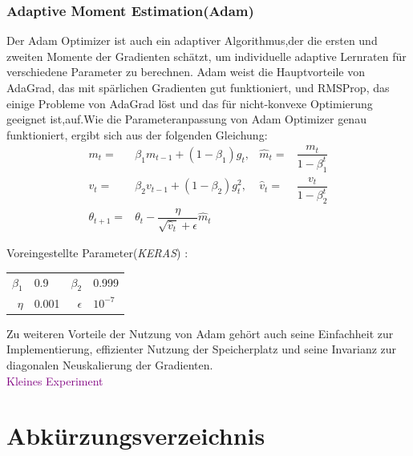 \documentclass[12pt,a4paper]{scrartcl}
\numberwithin{equation}{section}
\begin{document}
\subsubsection{Adaptive Moment Estimation(Adam)}
Der Adam\cite{adam} Optimizer ist auch ein adaptiver Algorithmus,der die ersten und zweiten Momente der Gradienten schätzt, um individuelle adaptive Lernraten für verschiedene Parameter zu berechnen.
Adam weist die Hauptvorteile von AdaGrad, das mit spärlichen Gradienten gut funktioniert, und RMSProp, das einige Probleme von AdaGrad löst und das für nicht-konvexe Optimierung geeignet ist,auf.Wie die Parameteranpassung von Adam Optimizer genau funktioniert, ergibt sich aus der folgenden Gleichung: 
\begin{equation}\label{ADAM}
\begin{aligned}
m_{t}=& \beta_{1}m_{t-1}+(1-\beta_{1})g_{t}, &  \widehat{m}_{t} =& \dfrac{m_{t}}{1-\beta_{1}^t}\\
v_{t}=& \beta_{2}v_{t-1}+(1-\beta_{2})g^2_t,&\widehat{v}_{t} =&\dfrac{v_t}{1-\beta_{2}^t}\\
\theta_{t+1} =& \theta_{t} -\dfrac{\eta}{\sqrt{\widehat{v}_{t}}+\epsilon}\widehat{m}_{t}
\end{aligned}
\end{equation}
\begin{center}
	Voreingestellte Parameter(\textit{KERAS}) :
	\begin{tabular}{r@{: }l r@{: }l}
		$ \beta_{1}$ & 0.9 &$ \beta_{2} $& 0.999\\
		$ \eta$& 0.001& $ \epsilon $ & $ 10^{-7} $
	\end{tabular}
\end{center}

Zu weiteren Vorteile der Nutzung von Adam gehört auch seine Einfachheit zur Implementierung, effizienter Nutzung der Speicherplatz und seine Invarianz zur diagonalen Neuskalierung der Gradienten.
\\ \textcolor{purple}{Kleines Experiment}

\section{Abkürzungsverzeichnis}
\begin{acronym}[THIBAUT]
\end{acronym}
\end{document}
